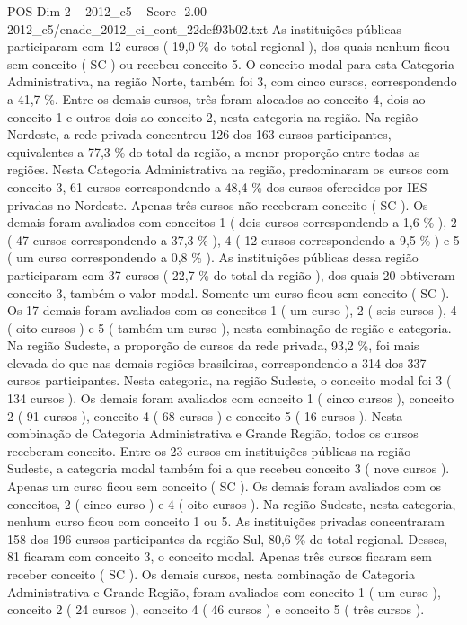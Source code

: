 \begin{textsample}{POS Dim 2 – 2012\_c5 – Score -2.00 – 2012\_c5/enade\_2012\_ci\_cont\_22dcf93b02.txt}
As instituições públicas participaram com 12 cursos ( 19,0 \% do total regional ), dos quais nenhum ficou sem conceito ( SC ) ou recebeu conceito 5.
O conceito modal para esta Categoria Administrativa, na região Norte, também foi 3, com cinco cursos, correspondendo a 41,7 \%.
Entre os demais cursos, três foram alocados ao conceito 4, dois ao conceito 1 e outros dois ao conceito 2, nesta categoria na região.
Na região Nordeste, a rede privada concentrou 126 dos 163 cursos participantes, equivalentes a 77,3 \% do total da região, a menor proporção entre todas as regiões.
Nesta Categoria Administrativa na região, predominaram os cursos com conceito 3, 61 cursos correspondendo a 48,4 \% dos cursos oferecidos por IES privadas no Nordeste.
Apenas três cursos não receberam conceito ( SC ).
Os demais foram avaliados com conceitos 1 ( dois cursos correspondendo a 1,6 \% ), 2 ( 47 cursos correspondendo a 37,3 \% ), 4 ( 12 cursos correspondendo a 9,5 \% ) e 5 ( um curso correspondendo a 0,8 \% ).
As instituições públicas dessa região participaram com 37 cursos ( 22,7 \% do total da região ), dos quais 20 obtiveram conceito 3, também o valor modal.
Somente um curso ficou sem conceito ( SC ).
Os 17 demais foram avaliados com os conceitos 1 ( um curso ), 2 ( seis cursos ), 4 ( oito cursos ) e 5 ( também um curso ), nesta combinação de região e categoria.
Na região Sudeste, a proporção de cursos da rede privada, 93,2 \%, foi mais elevada do que nas demais regiões brasileiras, correspondendo a 314 dos 337 cursos participantes.
Nesta categoria, na região Sudeste, o conceito modal foi 3 ( 134 cursos ).
Os demais foram avaliados com conceito 1 ( cinco cursos ), conceito 2 ( 91 cursos ), conceito 4 ( 68 cursos ) e conceito 5 ( 16 cursos ).
Nesta combinação de Categoria Administrativa e Grande Região, todos os cursos receberam conceito.
Entre os 23 cursos em instituições públicas na região Sudeste, a categoria modal também foi a que recebeu conceito 3 ( nove cursos ).
Apenas um curso ficou sem conceito ( SC ).
Os demais foram avaliados com os conceitos, 2 ( cinco curso ) e 4 ( oito cursos ).
Na região Sudeste, nesta categoria, nenhum curso ficou com conceito 1 ou 5.
As instituições privadas concentraram 158 dos 196 cursos participantes da região Sul, 80,6 \% do total regional.
Desses, 81 ficaram com conceito 3, o conceito modal.
Apenas três cursos ficaram sem receber conceito ( SC ).
Os demais cursos, nesta combinação de Categoria Administrativa e Grande Região, foram avaliados com conceito 1 ( um curso ), conceito 2 ( 24 cursos ), conceito 4 ( 46 cursos ) e conceito 5 ( três cursos ).

\end{textsample}
